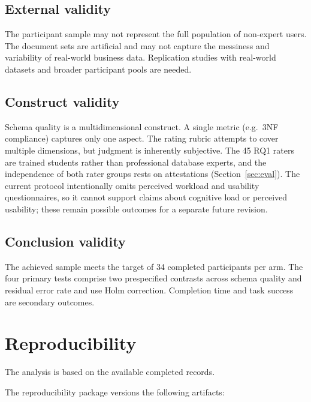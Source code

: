 \documentclass[11pt,a4paper]{article}
\begin{document}
\subsection{External validity}
The participant sample may not represent the full population of non-expert users. The document sets are artificial and may not capture the messiness and variability of real-world business data. Replication studies with real-world datasets and broader participant pools are needed.

\subsection{Construct validity}
Schema quality is a multidimensional construct. A single metric (e.g.\ 3NF compliance) captures only one aspect. The rating rubric attempts to cover multiple dimensions, but judgment is inherently subjective. The 45 RQ1 raters are trained students rather than professional database experts, and the independence of both rater groups rests on attestations (Section~\ref{sec:eval}). The current protocol intentionally omits perceived workload and usability questionnaires, so it cannot support claims about cognitive load or perceived usability; these remain possible outcomes for a separate future revision.

\subsection{Conclusion validity}
The achieved sample meets the target of 34 completed participants per arm. The four primary tests comprise two prespecified contrasts across schema quality and residual error rate and use Holm correction. Completion time and task success are secondary outcomes.

\section{Reproducibility}
\label{sec:reproducibility}
The analysis is based on the available completed records.

The reproducibility package versions the following artifacts:
\end{document}
